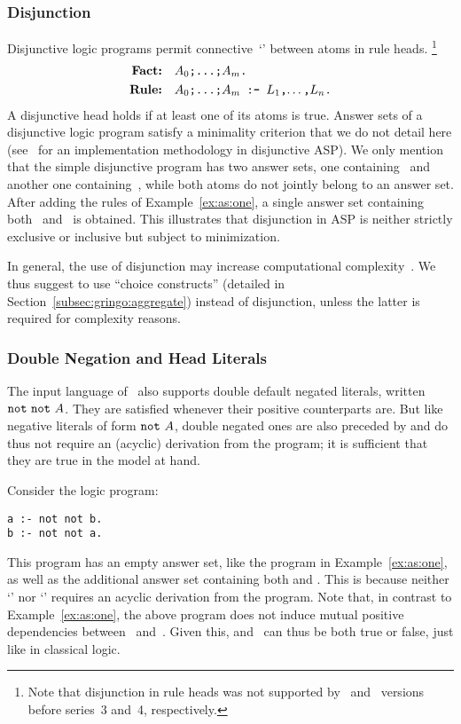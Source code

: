 \subsubsection{Disjunction}\label{subsec:gringo:disjunction}
Disjunctive logic programs permit connective~`\code{;}' between atoms in rule heads.%
\footnote{Note that disjunction in rule heads was not supported by \clasp\ and \clingo\ versions before series~3 and~4, respectively.}
\begin{align*}
\textbf{Fact:} & \quad \texttt{$A_0$;\dots;$A_m$.} \\
\textbf{Rule:} & \quad \texttt{$A_0$;\dots;$A_m$ :- $L_1$,$\dots$,$L_n$.}
\end{align*}
A disjunctive head holds if at least one of its atoms is true.
Answer sets of a disjunctive logic program satisfy a minimality criterion
that we do not detail here
(see~\cite{eitpol06a,gekasc11b} for an implementation methodology in disjunctive ASP).
We only mention that the simple disjunctive program  has two answer sets,
one containing~ and another one containing~,
while both atoms do not jointly belong to an answer set.
After adding the rules of Example~\ref{ex:as:one}, a single answer set containing both~ and~ is obtained.
This illustrates that disjunction in ASP is neither strictly exclusive or inclusive but subject to minimization.

In general, the use of disjunction may increase
computational complexity~\cite{eitgot95a}.
We thus suggest to use ``choice constructs'' (detailed in Section~\ref{subsec:gringo:aggregate})
instead of disjunction, unless the latter is required for complexity reasons.

\subsubsection{Double Negation and Head Literals}\label{subsec:gringo:double}

The input language of \gringo\ also supports double default negated literals,
written $\texttt{not}~\texttt{not}~A$.
They are satisfied whenever their positive counterparts are.
But like negative literals of form $\texttt{not}~A$,
double negated ones are also preceded by  and 
do thus not require an (acyclic) derivation from the program;
it is sufficient that they are true in the model at hand.

Consider the logic program:
\begin{lstlisting}[numbers=none]
a :- not not b.
b :- not not a.
\end{lstlisting}
%
This program has an empty answer set, like the program in Example~\ref{ex:as:one},
as well as the additional answer set containing both  and .
This is because neither `' nor `' requires an acyclic derivation from the program.
Note that, in contrast to Example~\ref{ex:as:one},
the above program does not induce
mutual positive dependencies between~ and~.
Given this,  and~ can thus be both true or false, just like in classical logic.

